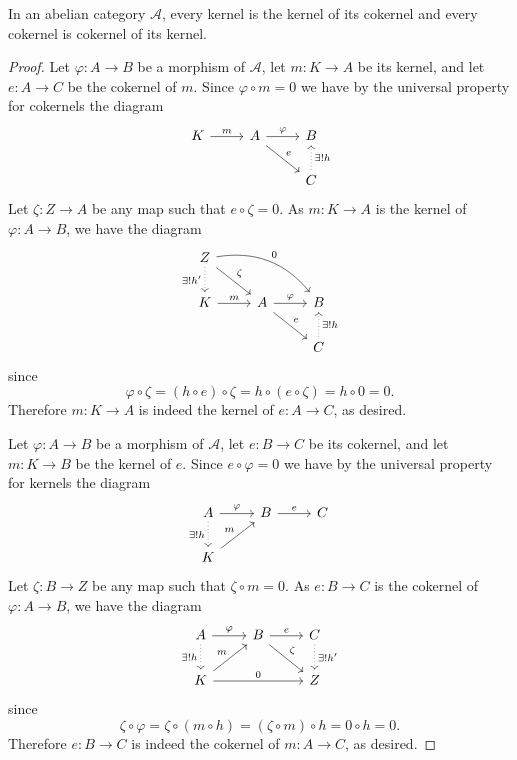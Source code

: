\documentclass[10pt]{amsart}
\begin{document}
\begin{lem}\label{lem4}
  In an abelian category $\mathcal{A}$, every kernel is the kernel of its cokernel and every cokernel is cokernel of its kernel.

  \begin{proof}
    Let $\varphi : A \rightarrow B$ be a morphism of $\mathcal{A}$, let $m : K \rightarrow A$ be its kernel, and let $e : A \rightarrow C$ be the cokernel of $m$.
    Since $\varphi \circ m = 0$ we have by the universal property for cokernels the diagram
    $$\begin{tikzcd}
      K \arrow{r}{m} &A \arrow{r}{\varphi} \arrow{rd}{e} & B\\
      & & C\arrow[swap,dotted]{u}{\exists ! h}
    \end{tikzcd}$$
    Let $\zeta : Z \rightarrow A$ be any map such that $e \circ \zeta = 0$.
    As $m : K \rightarrow A$ is the kernel of $\varphi : A \rightarrow B$, we have the diagram
    $$\begin{tikzcd}
      Z \arrow{rd}{\zeta} \arrow[swap, dotted]{d}{\exists !h^\prime}\arrow[bend left]{rrd}{0}\\
      K \arrow{r}{m} & A\arrow{r}{\varphi} \arrow{rd}{e}& B\\
      & & C \arrow[dotted,swap]{u}{\exists ! h}
    \end{tikzcd}$$
    since 
    $$\varphi \circ \zeta = (h \circ e) \circ \zeta = h \circ (e \circ \zeta) = h \circ 0 = 0.$$
    Therefore $m : K \rightarrow A$ is indeed the kernel of $e : A \rightarrow C$, as desired.

    Let $\varphi : A \rightarrow B$ be a morphism of $\mathcal{A}$, let $e : B \rightarrow C$ be its cokernel, and let $m : K \rightarrow B$ be the kernel of $e$.
    Since $e \circ \varphi = 0$ we have by the universal property for kernels the diagram
    $$\begin{tikzcd}
      A \arrow{r}{\varphi}\arrow[dotted,swap]{d}{\exists ! h} & B \arrow{r}{e} & C\\
      K \arrow{ur}{m}
    \end{tikzcd}$$
    Let $\zeta : B \rightarrow Z$ be any map such that $\zeta \circ m = 0$.
    As $e : B \rightarrow C$ is the cokernel of $\varphi : A \rightarrow B$, we have the diagram
    $$\begin{tikzcd}
      A \arrow{r}{\varphi}\arrow[dotted,swap]{d}{\exists ! h} & B \arrow{r}{e}\arrow{rd}{\zeta} & C \arrow[dotted]{d}{\exists ! h^\prime}\\
      K \arrow{ur}{m}\arrow{rr}{0} & & Z
    \end{tikzcd}$$
    since 
    $$\zeta \circ \varphi = \zeta \circ (m \circ h) = (\zeta \circ m) \circ h = 0 \circ h = 0.$$
    Therefore $e : B \rightarrow C$ is indeed the cokernel of $m : A \rightarrow C$, as desired.
  \end{proof}
\end{lem}
\end{document}
